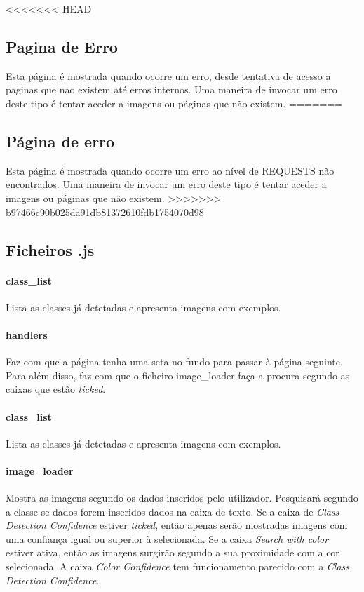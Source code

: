 \documentclass{report}
\begin{document}
<<<<<<< HEAD
\subsection{Pagina de Erro}
Esta página é mostrada quando ocorre um erro, desde tentativa de acesso a paginas que nao existem até erros internos.
Uma maneira de invocar um erro deste tipo é tentar aceder a imagens ou páginas que não existem. 
=======
\subsection{Página de erro}
Esta página é mostrada quando ocorre um erro ao nível de REQUESTS não encontrados. Uma maneira de invocar um erro deste tipo é tentar aceder a imagens ou páginas que não existem. 
>>>>>>> b97466c90b025da91db81372610fdb1754070d98

\subsection{Ficheiros .js}
\paragraph{class\_list}  Lista as classes já detetadas e apresenta imagens com exemplos.
\paragraph{handlers} Faz com que a página tenha uma seta no fundo para passar à página seguinte. Para além disso, faz com que o ficheiro image\_loader faça a procura segundo as caixas que estão \textit{ticked}.
\paragraph{class\_list}  Lista as classes já detetadas e apresenta imagens com exemplos.
\paragraph{image\_loader}Mostra as imagens segundo os dados inseridos pelo utilizador. 
Pesquisará segundo a classe se dados forem inseridos dados na caixa de texto. 
Se a caixa de \textit{Class Detection Confidence} estiver \textit{ticked}, então 
apenas serão mostradas imagens com uma confiança igual ou superior à selecionada. 
Se a caixa \textit{Search with color} estiver ativa, então as imagens surgirão segundo a 
sua proximidade com a cor selecionada. A caixa \textit{Color Confidence} tem funcionamento 
parecido com a \textit{Class Detection Confidence}. 
\end{document}
